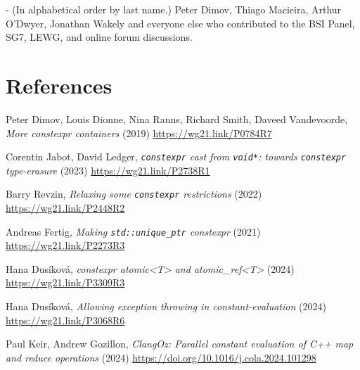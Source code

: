 \documentclass[10pt]{article}
\begin{document}
  - (In alphabetical order by last name.) Peter Dimov, Thiago Macieira, Arthur O'Dwyer, Jonathan Wakely and everyone else who contributed to the BSI Panel, SG7, LEWG, and online forum discussions.

\section{References}
\renewcommand{\section}[2]{}%
\begin{thebibliography}{9}

    Peter Dimov, Louis Dionne, Nina Ranns, Richard Smith, Daveed Vandevoorde,
    \emph{More constexpr containers} (2019)\newline
    \url{https://wg21.link/P0784R7}

    Corentin Jabot, David Ledger,
    \emph{\texttt{constexpr} cast from \texttt{void*}: towards \texttt{constexpr} type-erasure} (2023)\newline
    \url{https://wg21.link/P2738R1}

    Barry Revzin,
    \emph{Relaxing some \texttt{constexpr} restrictions} (2022)\newline
    \url{https://wg21.link/P2448R2}

    Andreas Fertig,
    \emph{Making \texttt{std::unique\_ptr} constexpr} (2021)\newline
    \url{https://wg21.link/P2273R3}

    Hana Dusíková,
    \emph{constexpr atomic<T> and atomic\_ref<T>} (2024)\newline
    \url{https://wg21.link/P3309R3}

    Hana Dusíková,
    \emph{Allowing exception throwing in constant-evaluation} (2024)\newline
    \url{https://wg21.link/P3068R6}

    Paul Keir, Andrew Gozillon,
    \emph{ClangOz: Parallel constant evaluation of C++ map and reduce operations} (2024)\newline
    \url{https://doi.org/10.1016/j.cola.2024.101298}

\end{thebibliography}
\end{document}
